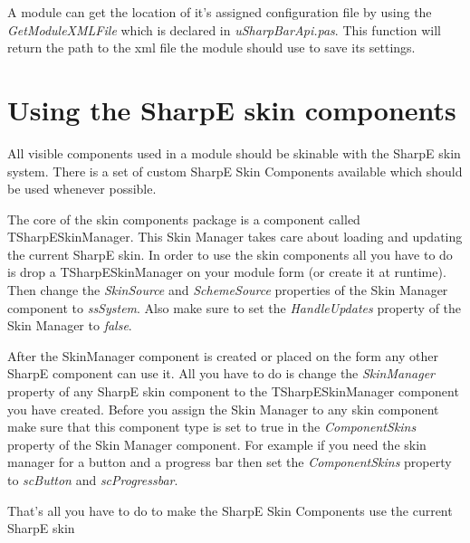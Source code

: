 \documentclass[a4paper]{article}
\begin{document}
  
  A module can get the location of it's assigned configuration file by using the {\it GetModuleXMLFile} which is declared in {\it uSharpBarApi.pas}.
  This function will return the path to the xml file the module should use to save its settings.  

\section{Using the SharpE skin components}
All visible components used in a module should be skinable with the SharpE skin system. There is a set of custom SharpE Skin Components available which should be used whenever possible. 

The core of the skin components package is a component called TSharpESkinManager. This Skin Manager takes care about loading and updating the current SharpE skin. In order to use the skin components all you have to do is drop a TSharpESkinManager on your module form (or create it at runtime). Then change the {\it SkinSource} and {\it SchemeSource} properties of the Skin Manager component to {\it ssSystem}. Also make sure to set the {\it HandleUpdates} property of the Skin Manager to {\it false}. 

After the SkinManager component is created or placed on the form any other SharpE component can use it. All you have to do is change the {\it SkinManager} property of any SharpE skin component to the TSharpESkinManager component you have created. Before you assign the Skin Manager to any skin component make sure that this component type is set to true in the {\it ComponentSkins} property of the Skin Manager component. For example if you need the skin manager for a button and a progress bar then set the {\it ComponentSkins} property to {\it scButton} and {\it scProgressbar}. 

That's all you have to do to make the SharpE Skin Components use the current SharpE skin
  
\end{document}
